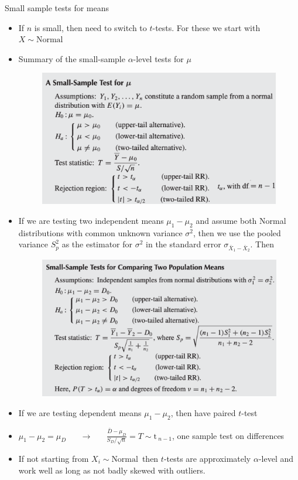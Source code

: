 \documentclass{article}
\newcommand{\follow}[1]{\sim \text{#1}\,}		%
\begin{document}
Small sample tests for means
\begin{itemize}
    \item If $n$ is small, then need to switch to $t$-tests. For these we start with $X \follow{Normal}$
    \item Summary of the small-sample $\alpha$-level tests for $\mu$
    \begin{figure}[H]
        \center\includegraphics[scale=0.5]{images/small-sample-tests-summary-one-mean.png}
    \end{figure}
    \item If we are testing two independent means $\mu_1 - \mu_2$ and assume both Normal distributions with common unknown variance $\sigma^2$, then we use the pooled variance $S^2_p$ as the estimator for $\sigma^2$ in the standard error $\sigma_{\bar{X}_1 - \bar{X}_2}$. Then
    \begin{figure}[H]
        \center\includegraphics[scale=0.5]{images/small-sample-tests-summary-two-means.png}
    \end{figure}
    \item If we are testing dependent means $\mu_1 - \mu_2$, then have paired $t$-test    \item[] $\mu_1 - \mu_2 = \mu_D \hspace{20pt} \rightarrow \hspace{20pt} \frac{\bar{D} - \mu_D}{S_D / \sqrt{n}} = T \follow{t}_{n-1}$, \hspace{20pt} one sample test on differences
    \item[] If not starting from $X_i \follow{Normal}$ then $t$-tests are approximately $\alpha$-level and work well as long as not badly skewed with outliers.
\end{itemize}\newpage
\end{document}
